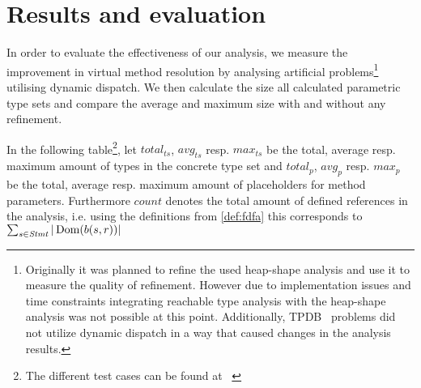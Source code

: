 \chapter{Results and evaluation}
\label{chap:results}
In order to evaluate the effectiveness of our analysis, we measure the improvement in virtual method resolution by analysing artificial problems\footnote{Originally it was planned to refine the used heap-shape analysis and use it to measure the quality of refinement. However due to implementation issues and time constraints integrating reachable type analysis with the heap-shape analysis was not possible at this point. Additionally, TPDB~\cite{tpdb} problems did not utilize dynamic dispatch in a way that caused changes in the analysis results.} utilising dynamic dispatch. We then calculate the size all calculated parametric type sets and compare the average and maximum size with and without any refinement.

In the following table\footnote{The different test cases can be found at ~\cite{github-testcases}}, let $\mathit{total}_\mathit{ts}$, $\mathit{avg}_\mathit{ts}$ resp. $\mathit{max}_\mathit{ts}$ be the total, average resp. maximum amount of types in the concrete type set and $\mathit{total}_{\mathit{p}}$, $\mathit{avg}_{\mathit{p}}$ resp. $\mathit{max}_{\mathit{p}}$ be the total, average resp. maximum amount of placeholders for method parameters. Furthermore $\mathit{count}$ denotes the total amount of defined references in the analysis, i.e. using the definitions from \cref{def:fdfa} this corresponds to $\sum_{s \in \mathit{Stmt}}|\operatorname{Dom}(b(s,r))|$

